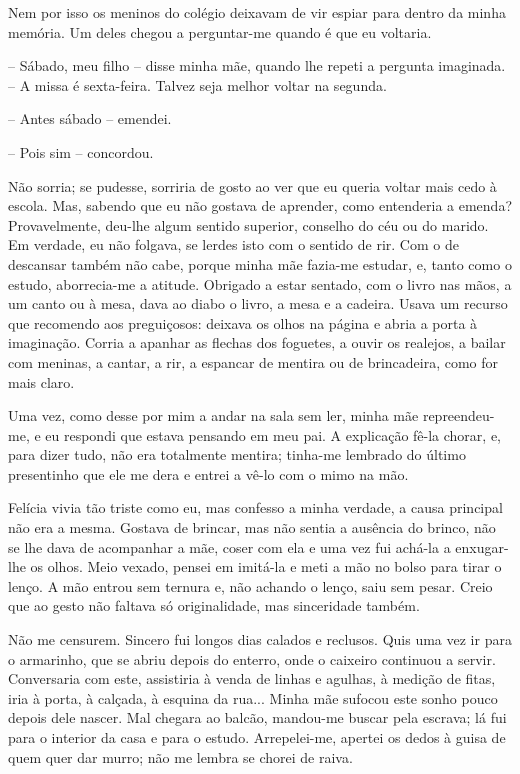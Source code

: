 Nem por isso os meninos do colégio deixavam de vir espiar para dentro da
minha memória. Um deles chegou a perguntar-me quando é que eu voltaria.

-- Sábado, meu filho -- disse minha mãe, quando lhe repeti a pergunta
imaginada. -- A missa é sexta-feira. Talvez seja melhor voltar na
segunda.

-- Antes sábado -- emendei.

-- Pois sim -- concordou.

Não sorria; se pudesse, sorriria de gosto ao ver que eu queria voltar
mais cedo à escola. Mas, sabendo que eu não gostava de aprender, como
entenderia a emenda? Provavelmente, deu-lhe algum sentido superior,
conselho do céu ou do marido. Em verdade, eu não folgava, se lerdes isto
com o sentido de rir. Com o de descansar também não cabe, porque minha
mãe fazia-me estudar, e, tanto como o estudo, aborrecia-me a atitude.
Obrigado a estar sentado, com o livro nas mãos, a um canto ou à mesa,
dava ao diabo o livro, a mesa e a cadeira. Usava um recurso que
recomendo aos preguiçosos: deixava os olhos na página e abria a porta à
imaginação. Corria a apanhar as flechas dos foguetes, a ouvir os
realejos, a bailar com meninas, a cantar, a rir, a espancar de mentira
ou de brincadeira, como for mais claro.

Uma vez, como desse por mim a andar na sala sem ler, minha mãe
repreendeu-me, e eu respondi que estava pensando em meu pai. A
explicação fê-la chorar, e, para dizer tudo, não era totalmente mentira;
tinha-me lembrado do último presentinho que ele me dera e entrei a vê-lo
com o mimo na mão.

Felícia vivia tão triste como eu, mas confesso a minha verdade, a causa
principal não era a mesma. Gostava de brincar, mas não sentia a ausência
do brinco, não se lhe dava de acompanhar a mãe, coser com ela e uma vez
fui achá-la a enxugar-lhe os olhos. Meio vexado, pensei em imitá-la e
meti a mão no bolso para tirar o lenço. A mão entrou sem ternura e, não
achando o lenço, saiu sem pesar. Creio que ao gesto não faltava só
originalidade, mas sinceridade também.

Não me censurem. Sincero fui longos dias calados e reclusos. Quis uma
vez ir para o armarinho, que se abriu depois do enterro, onde o caixeiro
continuou a servir. Conversaria com este, assistiria à venda de linhas e
agulhas, à medição de fitas, iria à porta, à calçada, à esquina da
rua... Minha mãe sufocou este sonho pouco depois dele nascer. Mal
chegara ao balcão, mandou-me buscar pela escrava; lá fui para o interior
da casa e para o estudo. Arrepelei-me, apertei os dedos à guisa de quem
quer dar murro; não me lembra se chorei de raiva.

